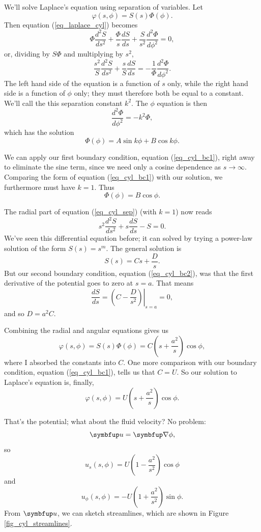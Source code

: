We'll solve Laplace's equation using separation of variables.  Let
\[
\varphi(s, \phi) = S(s) \Phi(\phi).
\]
Then equation (\ref{eq_laplace_cyl}) becomes
\[
\Phi \frac{d^2S}{ds^2} + \frac{\Phi}{s} \frac{dS}{ds} + \frac{S}{s^2} \frac{d^2 \Phi}{d\phi^2} = 0,
\]
or, dividing by $S\Phi$ and multiplying by $s^2$,
\begin{equation}
\label{eq_cyl_sep}
\frac{s^2}{S} \frac{d^2S}{ds^2} + \frac{s}{S} \frac{dS}{ds} = -\frac{1}{\Phi} \frac{d^2 \Phi}{d \phi^2}.
\end{equation}
The left hand side of the equation is a function of $s$ only, while the right hand side is a function of $\phi$ only; they must therefore both be equal to a constant.  We'll call the this separation constant $k^2$.  The $\phi$ equation is then
\[
\frac{d^2 \Phi}{d\phi^2} = -k^2 \Phi,
\]
which has the solution
\[
\Phi (\phi) = A \sin k\phi + B \cos k\phi.
\]

We can apply our first boundary condition, equation (\ref{eq_cyl_bc1}), right away to eliminate the sine term, since we need only a cosine dependence as $s \to \infty$.  Comparing the form of equation (\ref{eq_cyl_bc1}) with our solution, we furthermore must have $k=1$.  Thus 
\begin{equation}
\Phi(\phi) = B \cos \phi.
\end{equation}

The radial part of equation (\ref{eq_cyl_sep}) (with $k = 1$) now reads
\[
s^2 \frac{d^2S}{ds^2} + s \frac{dS}{ds} - S = 0.
\]
We've seen this differential equation before; it can solved by trying a power-law solution of the form $S(s) = s^m$.  The general solution is
\[
S(s) = Cs + \frac{D}{s}.
\]
But our second boundary condition, equation (\ref{eq_cyl_bc2}), was that the first derivative of the potential goes to zero at $s=a$.  That means
\[
\frac{dS}{ds} = \left. \left( C - \frac{D}{s^2} \right)  \right|_{s=a} = 0,
\]
and so $D = a^2 C$.

Combining the radial and angular equations gives us
\[
\varphi(s, \phi) = S(s) \Phi(\phi) = C \left( s+\frac{a^2}{s} \right) \cos \phi,
\]
where I absorbed the constants into $C$.  One more comparison with our boundary condition, equation (\ref{eq_cyl_bc1}), tells us that $C = U$.  So our solution to Laplace's equation is, finally, 
\begin{equation}
\varphi(s, \phi) = U \left( s+\frac{a^2}{s} \right) \cos \phi.
\end{equation}

That's the potential; what about the fluid velocity?  No problem:
\[
\uu = \grad \phi,
\]
so
\begin{equation}
u_s(s, \phi) = U \left( 1 - \frac{a^2}{s^2} \right) \cos \phi
\end{equation}
and
\begin{equation}
u_\phi(s, \phi) = -U \left( 1 + \frac{a^2}{s^2} \right) \sin \phi.
\end{equation}
From $\uu$, we can sketch streamlines, which are shown in Figure \ref{fig_cyl_streamlines}.

